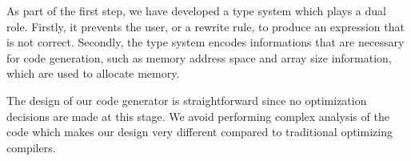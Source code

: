 As part of the first step, we have developed a type system which plays a dual role.
Firstly, it prevents the user, or a rewrite rule, to produce an expression that is not correct.
Secondly, the type system encodes informations that are necessary for code generation, such as memory address space and array size information, which are used to allocate memory.

The design of our code generator is straightforward since no optimization decisions are made at this stage.
We avoid performing complex analysis of the code which makes our design very different compared to traditional optimizing compilers.


